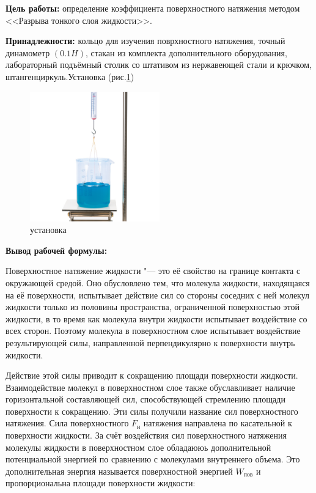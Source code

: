 \textbf{Цель работы:} определение коэффициента поверхностного натяжения методом <<Разрыва тонкого слоя жидкости>>.

\textbf{Принадлежности:} кольцо для изучения поврхностного натяжения, точный динамометр $(0.1H)$, стакан из комплекта дополнительного оборудования, лабораторный подъёмный столик со штативом из нержавеющей стали и крючком, штангенциркуль.Установка (рис.\ref{fig:installation})

\begin{figure}[!h]
    \centering
    \includegraphics[width = 0.5\textwidth]{image/image.png}
    \caption{установка}
    \label{fig:installation}
\end{figure}

\textbf{Вывод рабочей формулы:}

Поверхностное натяжение жидкости "--- это её свойство на границе контакта с окружающей средой. Оно обусловлено тем, что молекула жидкости, находящаяся на её поверхности, испытывает действие сил со стороны соседних с ней молекул жидкости только из половины пространства, ограниченной поверхностью этой жидкости, в то время как молекула внутри жидкости испытывает воздействие со всех сторон. Поэтому молекула в поверхностном слое испытывает воздействие результирующей силы, направленной перпендикулярно к поверхности внутрь жидкости.

Действие этой силы приводит к сокращению площади поверхности жидкости. Взаимодействие молекул в поверхностном слое также обуславливает наличие горизонтальной составляющей сил, способствующей стремлению площади поверхности к сокращению. Эти силы получили название сил поверхностного натяжения. Сила поверхностного \texttt{$F_\text{н}$} натяжения направлена по касательной к поверхности жидкости. За счёт воздействия сил поверхностного натяжения молекулы жидкости в поверхностном слое обладаююь дополнительной потенциальной энергией по сравнению с молекулами внутреннего объема. Это дополнительная энергия называется поверхностной энергией \texttt{$W_\text{пов}$} и пропорциональна площади поверхности жидкости:

